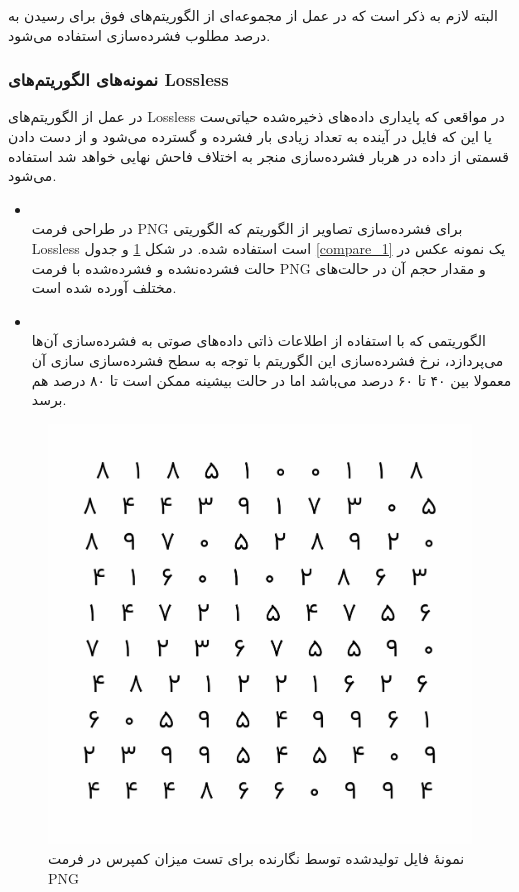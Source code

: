 البته لازم به ذکر است که در عمل از مجموعه‌ای از الگوریتم‌های فوق برای رسیدن به درصد مطلوب فشرده‌سازی استفاده می‌شود.

\subsubsection{نمونه‌های الگوریتم‌های Lossless}
در عمل از الگوریتم‌های Lossless در مواقعی که 
پایداری داده‌های ذخیره‌شده حیاتی‌ست یا این که فایل در آینده به تعداد زیادی بار فشرده و گسترده می‌شود و از دست دادن قسمتی از داده در
هربار فشرده‌سازی منجر به اختلاف فاحش نهایی خواهد شد استفاده می‌شود. 

\begin{itemize}
	\item {}\\
	در طراحی فرمت PNG برای فشرده‌سازی تصاویر از الگوریتم
	که الگوریتی Lossless است استفاده شده. 
	در 
	شکل 	\ref{example_1} و 
	جدول 	\ref{compare_1} 
	یک نمونه عکس در حالت فشرده‌نشده و فشرده‌شده با فرمت PNG
	و مقدار حجم آن در حالت‌های مختلف آورده شده است.

	\item {}\\
	الگوریتمی که با استفاده از اطلاعات ذاتی داده‌های صوتی به فشرده‌سازی آن‌ها می‌پردازد، نرخ فشرده‌سازی این الگوریتم با توجه به 
	سطح فشرده‌سازی سازی آن معمولا بین ۴۰ تا ۶۰ درصد می‌باشد اما در حالت بیشینه ممکن است تا ۸۰ درصد هم برسد.
	
\end{itemize}

\begin{figure}
	\centering
	\includegraphics[scale=0.6]{figs/compressed.png}
	\caption{نمونهٔ فایل تولیدشده توسط نگارنده برای تست میزان کمپرس در فرمت PNG}
	\label{example_1}
\end{figure}

